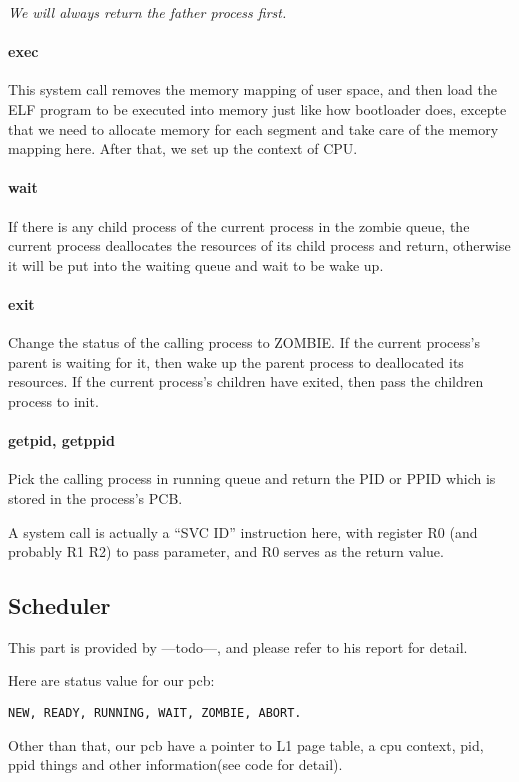 \documentclass[12pt]{article}
\begin{document}
\emph{We will always return the father process first.}

\paragraph{exec}
This system call removes the memory mapping of user space, and then load the ELF program to be executed into memory just like how bootloader does, excepte that we need to allocate memory for each segment and take care of the memory mapping here. After that, we set up the context of CPU.

\paragraph{wait}
If there is any child process of the current process in the zombie queue, the current process deallocates the resources of its child process and return, otherwise it will be put into the waiting queue and wait to be wake up.

\paragraph{exit}
Change the status of the calling process to ZOMBIE. If the current process's parent is waiting for it, then wake up the parent process to deallocated its resources. If the current process's children have exited, then pass the children process to init.

\paragraph{getpid, getppid}
Pick the calling process in running queue and return the PID or PPID which is stored in the process's PCB.



A system call is actually a ``SVC ID'' instruction here, with register R0 (and probably R1 R2) to pass parameter, and R0 serves as the return value.

\subsection{Scheduler}
This part is provided by ---todo---, and please refer to his report for detail.

Here are status value for our pcb:

\verb|NEW, READY, RUNNING, WAIT, ZOMBIE, ABORT.|

Other than that, our pcb have a pointer to L1 page table, a cpu context, pid, ppid things and other information(see code for detail).
\end{document}
